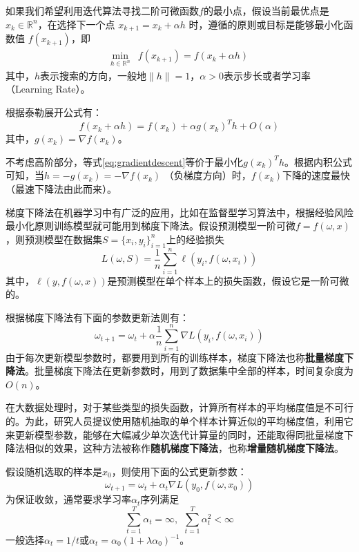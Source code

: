 如果我们希望利用迭代算法寻找二阶可微函数$f$的最小点，假设当前最优点是$x_k\in \mathbb{R}^n$，在选择下一个点 $x_{k+1} = x_k + \alpha h$ 时，遵循的原则或目标是能够最小化函数值
$f(x_{k+1})$，即
\begin{equation}\label{eq:gradientdescent}
    \begin{array}{ll}
        \min\limits_{h \in \mathbb{R}^n} & f(x_{k+1}) = f(x_k + \alpha h)
    \end{array}
\end{equation}
其中，$h$表示搜索的方向，一般地$\|h\| = 1$，$\alpha>0$表示步长或者学习率（Learning Rate）。

根据泰勒展开公式有：
\[
    f(x_k + \alpha h) = f(x_k) + \alpha g(x_k)^T h + O(\alpha)
\]
其中，$g(x_k) = \nabla f(x_k)$。

不考虑高阶部分，等式\eqref{eq:gradientdescent}等价于最小化$g(x_k)^T h$。根据内积公式可知，当$h = -g(x_k) = -\nabla f(x_k)$ （负梯度方向）时，$f(x_k)$下降的速度最快（最速下降法由此而来）。

梯度下降法在机器学习中有广泛的应用，比如在监督型学习算法中，根据经验风险最小化原则训练模型就可能用到梯度下降法。假设预测模型一阶可微$f=f(\omega,x)$，则预测模型在数据集$S=\{x_i,y_i\}_{i=1}^n$上的经验损失
\begin{equation}
    L(\omega,S) = \frac{1}{n} \sum\limits_{i=1}^n \ell(y_i,f(\omega,x_i))
\end{equation}
其中，$\ell(y,f(\omega,x))$是预测模型在单个样本上的损失函数，假设它是一阶可微的。

根据梯度下降法有下面的参数更新法则有：
\begin{equation}
    \omega_{t+1} = \omega_t + \alpha \frac{1}{n} \sum\limits_{i=1}^n \nabla L(y_i, f(\omega,x_i))
\end{equation}
由于每次更新模型参数时，都要用到所有的训练样本，梯度下降法也称\textbf{批量梯度下降法}。批量梯度下降法在更新参数时，用到了数据集中全部的样本，时间复杂度为$O(n)$。

在大数据处理时，对于某些类型的损失函数，计算所有样本的平均梯度值是不可行的。为此，研究人员提议使用随机抽取的单个样本计算近似的平均梯度值，利用它来更新模型参数，能够在大幅减少单次迭代计算量的同时，还能取得同批量梯度下降法相似的效果，这种方法被称作\textbf{随机梯度下降法}，也称\textbf{增量随机梯度下降法}。

假设随机选取的样本是$x_0$，则使用下面的公式更新参数：
\begin{equation}
    \omega_{t+1} = \omega_t + \alpha_t \nabla L(y_0, f(\omega,x_0))
\end{equation}
为保证收敛，通常要求学习率$\alpha_t$序列满足
\begin{equation}
    \sum\limits_{t=1}^T \alpha_t = \infty,~~\sum\limits_{t=1}^T \alpha_t^2 < \infty
\end{equation}
一般选择$\alpha_t=1/t$或$\alpha_t=\alpha_0(1+\lambda\alpha_0)^{-1}$。

